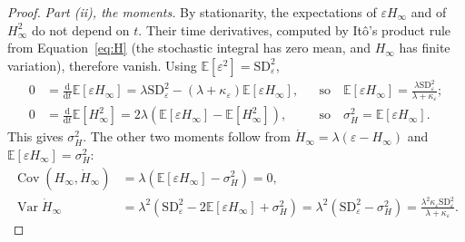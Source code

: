 \documentclass[a4paper,11pt]{article}
\theoremstyle{definition}
\newcommand{\E}{\mathbb E}
\newcommand{\Var}{\operatorname{Var}}
\newcommand{\Cov}{\operatorname{Cov}}
\newcommand{\dd}{\mathrm d}
\newcommand{\1}{\mathbbm{1}}
\begin{document}
\begin{proof}
\emph{Part (ii), the moments.} By stationarity, the expectations of $\varepsilon H_{\infty}$ and of $H_{\infty}^{2}$ do not depend on $t$. Their time derivatives, computed by Itô's product rule from Equation~\eqref{eq:H} (the stochastic integral has zero mean, and $H_{\infty}$ has finite variation), therefore vanish. Using $\E\left[\varepsilon^{2}\right]=\mathrm{SD}_{\varepsilon}^{2}$,
\begin{equation*}
\begin{aligned}
0&=\frac{\dd}{\dd t}\E\left[\varepsilon H_{\infty}\right]=\lambda\mathrm{SD}_{\varepsilon}^{2}-(\lambda+\kappa_{\varepsilon})\E\left[\varepsilon H_{\infty}\right], &&\text{so}\quad \E\left[\varepsilon H_{\infty}\right]=\frac{\lambda\mathrm{SD}_{\varepsilon}^{2}}{\lambda+\kappa_{\varepsilon}};\\
0&=\frac{\dd}{\dd t}\E\left[H_{\infty}^{2}\right]=2\lambda\left(\E\left[\varepsilon H_{\infty}\right]-\E\left[H_{\infty}^{2}\right]\right), &&\text{so}\quad \sigma_{H}^{2}=\E\left[\varepsilon H_{\infty}\right].
\end{aligned}
\end{equation*}
This gives $\sigma_{H}^{2}$. The other two moments follow from $\dot{H}_{\infty}=\lambda(\varepsilon-H_{\infty})$ and $\E\left[\varepsilon H_{\infty}\right]=\sigma_{H}^{2}$:
\begin{equation*}
\begin{aligned}
\Cov\left(H_{\infty},\dot{H}_{\infty}\right)&=\lambda\left(\E\left[\varepsilon H_{\infty}\right]-\sigma_{H}^{2}\right)=0,\\
\Var\dot{H}_{\infty}&=\lambda^{2}\left(\mathrm{SD}_{\varepsilon}^{2}-2\E\left[\varepsilon H_{\infty}\right]+\sigma_{H}^{2}\right)=\lambda^{2}\left(\mathrm{SD}_{\varepsilon}^{2}-\sigma_{H}^{2}\right)=\frac{\lambda^{2}\kappa_{\varepsilon}\mathrm{SD}_{\varepsilon}^{2}}{\lambda+\kappa_{\varepsilon}}.
\end{aligned}
\end{equation*}
\end{proof}
\end{document}
